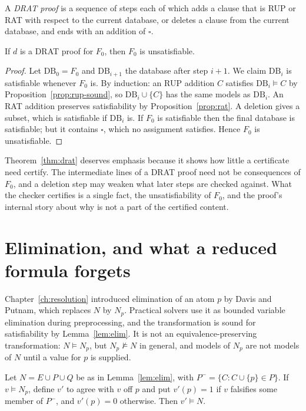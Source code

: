 A \emph{DRAT proof} is a sequence of steps each of which adds a clause that is RUP or RAT with respect to the current database, or deletes a clause from the current database, and ends with an addition of $\square$.

\begin{theorem}
\label{thm:drat}
If $d$ is a DRAT proof for $F_0$, then $F_0$ is unsatisfiable.
\end{theorem}

\begin{proof}
Let $\mathrm{DB}_0=F_0$ and $\mathrm{DB}_{i+1}$ the database after step $i+1$. We claim $\mathrm{DB}_i$ is satisfiable whenever $F_0$ is. By induction: an RUP addition $C$ satisfies $\mathrm{DB}_i\models C$ by Proposition~\ref{prop:rup-sound}, so $\mathrm{DB}_i\cup\{C\}$ has the same models as $\mathrm{DB}_i$. An RAT addition preserves satisfiability by Proposition~\ref{prop:rat}. A deletion gives a subset, which is satisfiable if $\mathrm{DB}_i$ is. If $F_0$ is satisfiable then the final database is satisfiable; but it contains $\square$, which no assignment satisfies. Hence $F_0$ is unsatisfiable.
\end{proof}

Theorem~\ref{thm:drat} deserves emphasis because it shows how little a certificate need certify. The intermediate lines of a DRAT proof need not be consequences of $F_0$, and a deletion step may weaken what later steps are checked against. What the checker certifies is a single fact, the unsatisfiability of $F_0$, and the proof's internal story about why is not a part of the certified content.

\section{Elimination, and what a reduced formula forgets}
\label{sec:model-reconstruction}

Chapter~\ref{ch:resolution} introduced elimination of an atom $p$ by Davis and Putnam, which replaces $N$ by $N_p$. Practical solvers use it as bounded variable elimination during preprocessing, and the transformation is sound for satisfiability by Lemma~\ref{lem:elim}. It is not an equivalence-preserving transformation: $N\models N_p$, but $N_p\not\models N$ in general, and models of $N_p$ are not models of $N$ until a value for $p$ is supplied.

\begin{proposition}
\label{prop:reconstruct}
Let $N=E\cup P\cup Q$ be as in Lemma~\ref{lem:elim}, with $P^-=\{C:C\cup\{p\}\in P\}$. If $v\models N_p$, define $v'$ to agree with $v$ off $p$ and put $v'(p)=1$ if $v$ falsifies some member of $P^-$, and $v'(p)=0$ otherwise. Then $v'\models N$.
\end{proposition}

